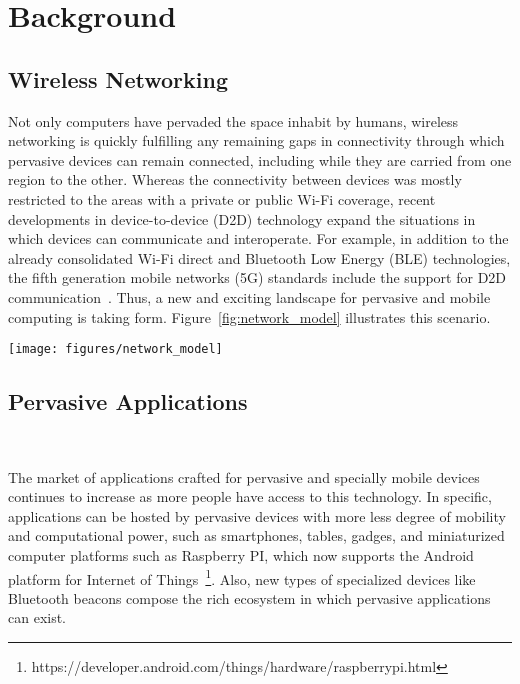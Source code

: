 \section{Background}\label{sec:mobile_applications}


\subsection{Wireless Networking}

Not only computers have pervaded the space inhabit by humans, wireless networking is quickly fulfilling any remaining gaps in connectivity through which pervasive devices can remain connected, including while they are carried from one region to the other. Whereas the connectivity between devices was mostly restricted to the areas with a private or public Wi-Fi coverage, recent developments in device-to-device (D2D) technology expand the situations in which devices can communicate and interoperate. For example, in addition to the already consolidated Wi-Fi direct and Bluetooth Low Energy (BLE) technologies, the fifth generation mobile networks (5G) standards include the support for D2D communication~\cite{Tehrani:2014}. Thus, a new and exciting landscape for pervasive and mobile computing is taking form. Figure~\ref{fig:network_model} illustrates this scenario.

\begin{figure*}[t!]
	\centering
	\texttt{[image: figures/network\_model]}
	\caption{Application nodes communicating through Wi-Fi or D2D technologies}
	\label{fig:network_model}
\end{figure*}

\subsection{Pervasive Applications}~\label{sec:characterization}

The market of applications crafted for pervasive and specially mobile devices continues to increase as more people have access to this technology. In specific, applications can be hosted by pervasive devices with more less degree of mobility and computational power, such as smartphones, tables, gadges, and miniaturized computer platforms such as Raspberry PI, which now supports the Android platform for Internet of Things~\footnote{https://developer.android.com/things/hardware/raspberrypi.html}. Also, new types of specialized devices like Bluetooth beacons compose the rich ecosystem in which pervasive applications can exist.

